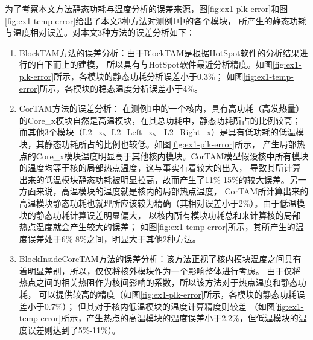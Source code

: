 为了考察本文方法静态功耗与温度分析的误差来源，图\ref{fig:ex1-plk-error}和图\ref{fig:ex1-temp-error}给出了本文3种方法对测例1中的各个模块， 所产生的静态功耗与温度相对误差。对本文3种方法的误差分析如下：
\begin{enumerate}[1)]
\item BlockTAM方法的误差分析：由于BlockTAM是根据HotSpot软件的分析结果进行的自下而上的建模， 所以具有与HotSpot软件最近分析精度。如图\ref{fig:ex1-plk-error}所示，各模块的静态功耗分析误差小于0.3\%； 如图\ref{fig:ex1-temp-error}所示，各模块的稳态温度分析误差小于4\%。
\item CorTAM方法的误差分析： 在测例1中的一个核内，具有高功耗（高发热量）的Core\_x模块自然是高温模块，在其总功耗中，静态功耗所占的比例较高； 而其他3个模块（L2\_x、L2\_Left\_x、 L2\_Right\_x）是具有低功耗的低温模块，其静态功耗所占的比例也较低。如图\ref{fig:ex1-plk-error}所示， 产生局部热点的Core\_x模块温度明显高于其他核内模块。CorTAM模型假设核中所有模块的温度均等于核的局部热点温度，这与事实有着较大的出入， 导致其所计算出来的低温模块静态功耗被明显拉高，故而产生了11\%-15\%的较大误差。另一方面来说，高温模块的温度就是核内的局部热点温度， CorTAM所计算出来的高温模块静态功耗也就理所应该较为精确（其相对误差小于2\%）。由于低温模块的静态功耗计算误差明显偏大， 以核内所有模块功耗总和来计算核的局部热点温度就会产生较大的误差； 如图\ref{fig:ex1-temp-error}所示，其所产生的温度误差处于6\%-8\%之间，明显大于其他2种方法。

\item BlockInsideCoreTAM方法的误差分析：该方法正视了核内模块温度之间具有着明显差别，所以，仅仅将核外模块作为一个影响整体进行考虑。 由于仅将热点之间的相关热阻作为核间影响的系数，所以该方法对于热点温度和静态功耗， 可以提供较高的精度（如图\ref{fig:ex1-plk-error}所示，各模块的静态功耗误差小于0.7\%）； 但其对于核内低温模块的温度计算精度则较差 （如图\ref{fig:ex1-temp-error}所示，产生热点的高温模块的温度误差小于2.2\%，但低温模块的温度误差则达到了5\%-11\%）。
\end{enumerate}


